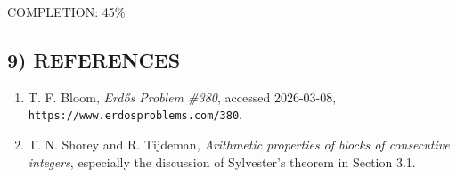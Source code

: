 COMPLETION: 45\%

\subsection*{9) REFERENCES}

\begin{enumerate}
\item T. F. Bloom, \emph{Erd\H{o}s Problem \#380}, accessed 2026-03-08, \texttt{https://www.erdosproblems.com/380}.
\item T. N. Shorey and R. Tijdeman, \emph{Arithmetic properties of blocks of consecutive integers}, especially the discussion of Sylvester's theorem in Section 3.1.
\end{enumerate}

